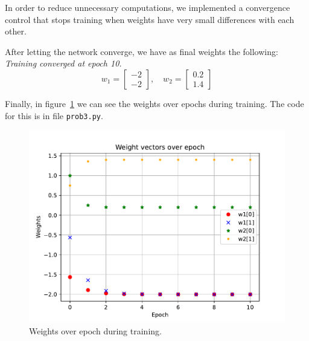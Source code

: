 In order to reduce unnecessary computations, we implemented a convergence control that stops training when weights have very small differences with each other.

After letting the network converge, we have as final weights the following:\\
\textit{\small Training converged at epoch 10.}
\[
w_1 = \left[
\begin{array}{c}
	-2\\-2
\end{array}
\right], \quad
w_2 = \left[
\begin{array}{c}
	0.2\\1.4
\end{array}
\right]
\] 

Finally, in figure~\ref{fig:prob3_weights_over_epoch} we can see the weights over epochs during training.
The code for this is in file \verb|prob3.py|.

\begin{figure}[htpb]
	\centering
	\includegraphics[width=0.47\linewidth]{../Problem 3/prob3_weights_over_epoch.pdf}
	\caption{Weights over epoch during training.}
	\label{fig:prob3_weights_over_epoch}
\end{figure}

